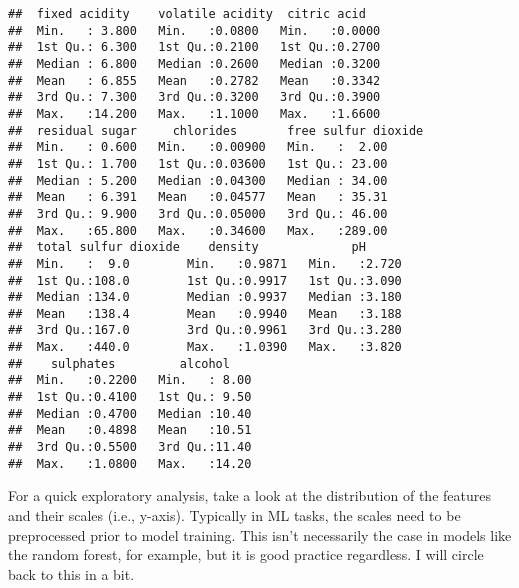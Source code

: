 \documentclass[
]{book}
\begin{document}
\begin{verbatim}
##  fixed acidity    volatile acidity  citric acid    
##  Min.   : 3.800   Min.   :0.0800   Min.   :0.0000  
##  1st Qu.: 6.300   1st Qu.:0.2100   1st Qu.:0.2700  
##  Median : 6.800   Median :0.2600   Median :0.3200  
##  Mean   : 6.855   Mean   :0.2782   Mean   :0.3342  
##  3rd Qu.: 7.300   3rd Qu.:0.3200   3rd Qu.:0.3900  
##  Max.   :14.200   Max.   :1.1000   Max.   :1.6600  
##  residual sugar     chlorides       free sulfur dioxide
##  Min.   : 0.600   Min.   :0.00900   Min.   :  2.00     
##  1st Qu.: 1.700   1st Qu.:0.03600   1st Qu.: 23.00     
##  Median : 5.200   Median :0.04300   Median : 34.00     
##  Mean   : 6.391   Mean   :0.04577   Mean   : 35.31     
##  3rd Qu.: 9.900   3rd Qu.:0.05000   3rd Qu.: 46.00     
##  Max.   :65.800   Max.   :0.34600   Max.   :289.00     
##  total sulfur dioxide    density             pH       
##  Min.   :  9.0        Min.   :0.9871   Min.   :2.720  
##  1st Qu.:108.0        1st Qu.:0.9917   1st Qu.:3.090  
##  Median :134.0        Median :0.9937   Median :3.180  
##  Mean   :138.4        Mean   :0.9940   Mean   :3.188  
##  3rd Qu.:167.0        3rd Qu.:0.9961   3rd Qu.:3.280  
##  Max.   :440.0        Max.   :1.0390   Max.   :3.820  
##    sulphates         alcohol     
##  Min.   :0.2200   Min.   : 8.00  
##  1st Qu.:0.4100   1st Qu.: 9.50  
##  Median :0.4700   Median :10.40  
##  Mean   :0.4898   Mean   :10.51  
##  3rd Qu.:0.5500   3rd Qu.:11.40  
##  Max.   :1.0800   Max.   :14.20
\end{verbatim}

For a quick exploratory analysis, take a look at the distribution of the features and their scales (i.e., y-axis). Typically in ML tasks, the scales need to be preprocessed prior to model training. This isn't necessarily the case in models like the random forest, for example, but it is good practice regardless. I will circle back to this in a bit.
\end{document}
